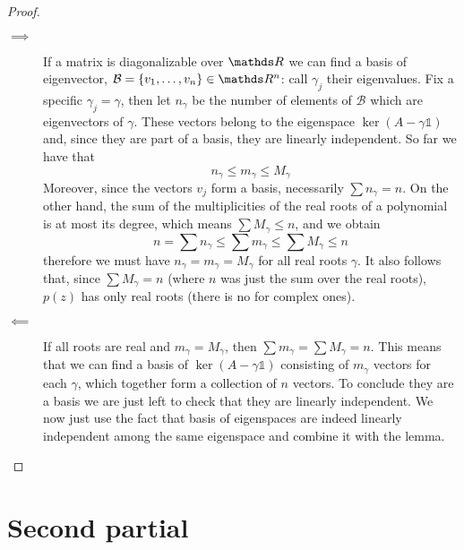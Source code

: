 \documentclass[12pt]{extarticle}
\numberwithin{equation}{section}
\begin{document}
\begin{proof}
    \begin{description}
        \item[$\implies$] If a matrix is diagonalizable over $\R$ we can find a basis of eigenvector,
              $\mathcal B = \{v_1, \dots, v_n \} \in \R^n$: call $\gamma_j$ their eigenvalues.
              Fix a specific $\gamma_j = \gamma$, then let $n_\gamma$ be the number of elements of $\mathcal B$
              which are eigenvectors of $\gamma$.
              These vectors belong to the eigenspace $\ker (A - \gamma \mathds 1)$ and,
              since they are part of a basis, they are linearly independent.
              So far we have that
              \begin{equation}
                  n_\gamma \leq m_\gamma \leq M_\gamma
              \end{equation}
              Moreover, since the vectors $v_j$ form a basis, necessarily $\sum n_\gamma = n$.
              On the other hand, the sum of the multiplicities of the real roots of a polynomial is at most its degree,
              which means $\sum M_\gamma \leq n$, and we obtain
              \begin{equation}
                  n = \sum n_\gamma \leq \sum m_\gamma \leq \sum M_\gamma \leq n
              \end{equation}
              therefore we must have $n_\gamma = m_\gamma = M_\gamma$ for all real roots $\gamma$.
              It also follows that, since $\sum M_\gamma = n$ (where $n$ was just the sum over the real roots),
              $p(z)$ has only real roots (there is no  for complex ones).
        \item[$\impliedby$] If all roots are real and $m_\gamma = M_\gamma$, then $\sum m_\gamma = \sum M_\gamma = n$.
              This means that we can find a basis of $\ker(A - \gamma \mathds{1})$ consisting of $m_\gamma$ vectors
              for each $\gamma$, which together form a collection of $n$ vectors.
              To conclude they are a basis we are just left to check that they are linearly independent.
              We now just use the fact that basis of eigenspaces are indeed linearly independent among the same eigenspace
              and combine it with the lemma.
    \end{description}
\end{proof}

\section{Second partial}
\end{document}
